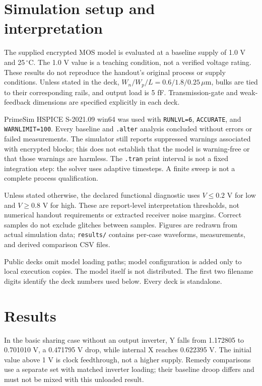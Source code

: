 \section{Simulation setup and interpretation}

The supplied encrypted MOS model is evaluated at a baseline supply of 1.0 V and 25\,$^\circ$C. The 1.0 V value is a teaching condition, not a verified voltage rating. These results do not reproduce the handout's original process or supply conditions. Unless stated in the deck, $W_n/W_p/L=0.6/1.8/0.25\,\mu\mathrm m$, bulks are tied to their corresponding rails, and output load is 5 fF. Transmission-gate and weak-feedback dimensions are specified explicitly in each deck.

PrimeSim HSPICE S-2021.09 win64 was used with \texttt{RUNLVL=6}, \texttt{ACCURATE}, and \texttt{WARNLIMIT=100}. Every baseline and \texttt{.alter} analysis concluded without errors or failed measurements. The simulator still reports suppressed warnings associated with encrypted blocks; this does not establish that the model is warning-free or that those warnings are harmless. The \texttt{.tran} print interval is not a fixed integration step: the solver uses adaptive timesteps. A finite sweep is not a complete process qualification.

Unless stated otherwise, the declared functional diagnostic uses $V\leq0.2$ V for low and $V\geq0.8$ V for high. These are report-level interpretation thresholds, not numerical handout requirements or extracted receiver noise margins. Correct samples do not exclude glitches between samples. Figures are redrawn from actual simulation data; \texttt{results/} contains per-case waveforms, measurements, and derived comparison CSV files.

Public decks omit model loading paths; model configuration is added only to local execution copies. The model itself is not distributed. The first two filename digits identify the deck numbers used below. Every deck is standalone.

\section{Results}

In the basic sharing case without an output inverter, Y falls from 1.172805 to 0.701010 V, a 0.471795 V drop, while internal X reaches 0.622395 V. The initial value above 1 V is clock feedthrough, not a higher supply. Remedy comparisons use a separate set with matched inverter loading; their baseline droop differs and must not be mixed with this unloaded result.

